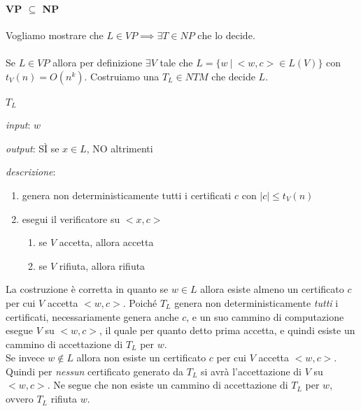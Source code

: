 \paragraph{VP $\subseteq$ NP} 

Vogliamo mostrare che $L \in VP \implies \exists T \in NP \text{ che lo decide}$.
\\
\\
Se $L \in VP$ allora per definizione $\exists V$ tale che $ L = \{ w \ | \ <w, c> \in L(V)\}$ con $t_V(n) = O(n^k)$. Costruiamo una $T_L \in NTM$ che decide $L$.

\newpage

$T_L$
\begin{description}
	\item \textit{input}: $w$ 
	\item \textit{output}: SÌ se $x \in L$, NO altrimenti
	\item \textit{descrizione}:
	\begin{enumerate}[label*=\arabic*.]
		\item genera non deterministicamente tutti i certificati $c$ con $|c| \leq t_V(n)$

		\item esegui il verificatore su $<x, c>$
		\begin{enumerate}[label*=\arabic*.]
			\item se $V$ accetta, allora accetta
			\item se $V$ rifiuta, allora rifiuta
		\end{enumerate}
	\end{enumerate}
\end{description}

La costruzione è corretta in quanto se $w \in L$ allora esiste almeno un certificato $c$ per cui $V$ accetta $<w, c>$. Poiché $T_L$ genera non deterministicamente \textit{tutti} i certificati, necessariamente genera anche $c$, e un suo cammino di computazione esegue $V$ su $<w, c>$, il quale per quanto detto prima accetta, e quindi esiste un cammino di accettazione di $T_L$ per $w$.
\\
Se invece $w \notin L$ allora non esiste un certificato $c$ per cui $V$ accetta $<w, c>$. Quindi per \textit{nessun} certificato generato da $T_L$ si avrà l'accettazione di $V$ su $<w, c>$. Ne segue che non esiste un cammino di accettazione di $T_L$ per $w$, ovvero $T_L$ rifiuta $w$.
